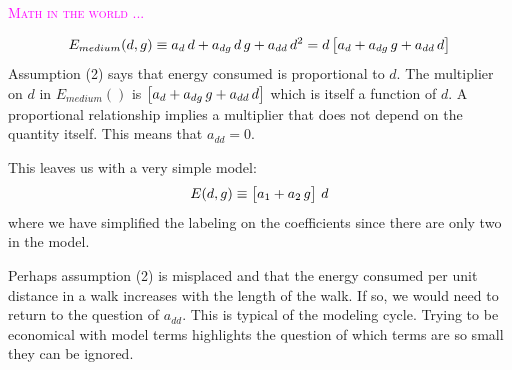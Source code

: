 \documentclass[
  letterpaper,
  DIV=11,
  numbers=noendperiod,
  oneside]{scrreprt}
\newenvironment{intheworld}%
{%
\textcolor{magenta}{\hrulefill}%
  \par\vspace{.3\baselineskip}%
  \textcolor{magenta}{\scshape Math in the world ...}%
  \par\vspace{\baselineskip}%
}%
{\textcolor{magenta}{\hrulefill}}
\begin{document}
\begin{intheworld}
\[E_{medium}(d, g) \equiv  a_d\, d + a_{dg}\, d\, g + a_{dd}\,d^2 = d \left[\strut a_d + a_{dg}\, g + a_{dd}\,d\right]\]
Assumption (2) says that energy consumed is proportional to \(d\). The
multiplier on \(d\) in \(E_{medium}()\) is
\(\left[\strut a_d + a_{dg}\, g + a_{dd}\,d\right]\) which is itself a
function of \(d\). A proportional relationship implies a multiplier that
does not depend on the quantity itself. This means that \(a_{dd} = 0\).

This leaves us with a very simple model:
\[E(d, g) \equiv \left[\strut a_1 + a_2\, g\right]\, d\] where we have
simplified the labeling on the coefficients since there are only two in
the model.

Perhaps assumption (2) is misplaced and that the energy consumed per
unit distance in a walk increases with the length of the walk. If so, we
would need to return to the question of \(a_{dd}\). This is typical of
the modeling cycle. Trying to be economical with model terms highlights
the question of which terms are so small they can be ignored.

\end{intheworld}
\end{document}
